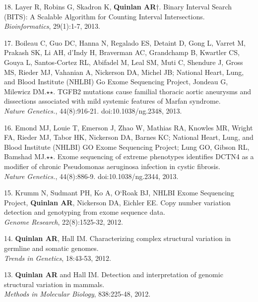 \documentclass[margin,line]{cv}
\begin{document}
\begin{resume}
\begin{list}{*}{}
    \item[18.] Layer R, Robins G, Skadron K, \textbf{Quinlan AR}$\dagger$. 
    Binary Interval Search (BITS): A Scalable Algorithm for Counting Interval Intersections.\\
    \emph{Bioinformatics}, 29(1):1-7, 2013.
	
    \item[17.] Boileau C, Guo DC, Hanna N, Regalado ES, Detaint D, Gong L, Varret M, Prakash SK, Li AH, d'Indy H, Braverman AC, Grandchamp B, Kwartler CS, Gouya L, Santos-Cortez RL, Abifadel M, Leal SM, Muti C, Shendure J, Gross MS, Rieder MJ, Vahanian A, Nickerson DA, Michel JB; National Heart, Lung, and Blood Institute (NHLBI) Go Exome Sequencing Project, Jondeau G, Milewicz DM.$\star$$\star$. TGFB2 mutations cause familial thoracic aortic aneurysms and dissections associated with mild systemic features of Marfan syndrome.\\
    \emph{Nature Genetics.}, 44(8):916-21. doi:10.1038/ng.2348, 2013.

    \item[16.] Emond MJ, Louie T, Emerson J, Zhao W, Mathias RA, Knowles MR, Wright FA, Rieder MJ, Tabor HK, Nickerson DA, Barnes KC; National Heart, Lung, and Blood Institute (NHLBI) GO Exome Sequencing Project; Lung GO, Gibson RL, Bamshad MJ.$\star$$\star$. Exome sequencing of extreme phenotypes identifies DCTN4 as a modifier of chronic Pseudomonas aeruginosa infection in cystic fibrosis.\\
    \emph{Nature Genetics.}, 44(8):886-9. doi:10.1038/ng.2344, 2013.

    \item[15.] Krumm N, Sudmant PH, Ko A, O`Roak BJ, NHLBI Exome Sequencing Project, 
    \textbf{Quinlan AR}, Nickerson DA, Eichler EE. 
    Copy number variation detection and genotyping from exome sequence data.\\
    \textit{Genome Research}, 22(8):1525-32, 2012.

    \item[14.] \textbf{Quinlan AR}, Hall IM. 
    Characterizing complex structural variation in germline and somatic genomes.\\
    \textit{Trends in Genetics}, 18:43-53, 2012.

    \item[13.] \textbf{Quinlan AR} and Hall IM. 
    Detection and interpretation of genomic structural variation in mammals.\\
    \textit{Methods in Molecular Biology}, 838:225-48, 2012.
   

\end{list}
\end{resume}
\end{document}
